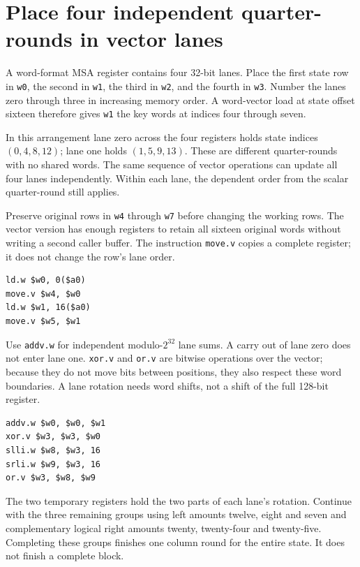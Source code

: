 \section{Place four independent quarter-rounds in vector lanes}
A word-format MSA register contains four 32-bit lanes. Place the first state row
in \texttt{w0}, the second in \texttt{w1}, the third in \texttt{w2}, and the fourth
in \texttt{w3}. Number the lanes zero through three in increasing memory order.
A word-vector load at state offset sixteen therefore gives \texttt{w1} the key
words at indices four through seven.

In this arrangement lane zero across the four registers holds state indices
\((0,4,8,12)\); lane one holds \((1,5,9,13)\). These are different quarter-rounds
with no shared words. The same sequence of vector operations can update all four
lanes independently. Within each lane, the dependent order from the scalar
quarter-round still applies.

Preserve original rows in \texttt{w4} through \texttt{w7} before changing the working
rows. The vector version has enough registers to retain all sixteen original words
without writing a second caller buffer. The instruction \texttt{move.v} copies a
complete register; it does not change the row's lane order.
\begin{verbatim}
ld.w $w0, 0($a0)
move.v $w4, $w0
ld.w $w1, 16($a0)
move.v $w5, $w1
\end{verbatim}

Use \texttt{addv.w} for independent modulo-\(2^{32}\) lane sums. A carry out of lane
zero does not enter lane one. \texttt{xor.v} and \texttt{or.v} are bitwise operations
over the vector; because they do not move bits between positions, they also respect
these word boundaries. A lane rotation needs word shifts, not a shift of the full
128-bit register.
\begin{verbatim}
addv.w $w0, $w0, $w1
xor.v $w3, $w3, $w0
slli.w $w8, $w3, 16
srli.w $w9, $w3, 16
or.v $w3, $w8, $w9
\end{verbatim}

The two temporary registers hold the two parts of each lane's rotation. Continue
with the three remaining groups using left amounts twelve, eight and seven and
complementary logical right amounts twenty, twenty-four and twenty-five.
Completing these groups finishes one column round for the entire state. It does not
finish a complete block.
